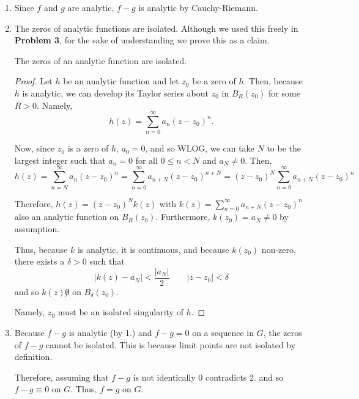 \documentclass[12pt]{Qual}
\begin{document}
\begin{solution}$\,$
\begin{center}
\end{center}
\begin{enumerate}
    \item Since $f$ and $g$ are analytic, $f-g$ is analytic by Cauchy-Riemann.
    \item The zeros of analytic functions are isolated. Although we used this freely in \textbf{Problem 3}, for the sake of understanding we prove this as a claim.
    \begin{claim} The zeros of an analytic function are isolated.
    \begin{proof} Let $h$ be an analytic function and let $z_0$ be a zero of $h.$ Then, because $h$ is analytic, we can develop its Taylor series about $z_0$ in $B_R(z_0)$ for some $R>0$. Namely, $$h(z)=\sum_{n=0}^\infty a_n(z-z_0)^n.$$

    Now, since $z_0$ is a zero of $h$, $a_0=0$, and so WLOG, we can take $N$ to be the largest integer such that $a_n=0$ for all $0\le n<N$ and $a_N\not=0$. Then, $$h(z)=\sum_{n=N}^\infty a_n(z-z_0)^n=\sum_{n=0}^\infty a_{n+N}(z-z_0)^{n+N}=(z-z_0)^N\sum_{n=0}^\infty a_{n+N}(z-z_0)^n$$

    Therefore, $h(z)=(z-z_0)^Nk(z)$ with $k(z)=\sum_{n=0}^\infty a_{n+N}(z-z_0)^n$ also an analytic function on $B_R(z_0)$. Furthermore, $k(z_0)=a_N\not=0$ by assumption.

    Thus, because $k$ is analytic, it is continuous, and because $k(z_0)$ non-zero, there exists a $\delta>0$ such that $$|k(z)-a_N|<\frac{|a_N|}{2}\qquad |z-z_0|<\delta$$ and so $k(z)\not0$ on $B_\delta(z_0)$.

    Namely, $z_0$ must be an isolated singularity of $h$.
    \end{proof}
    \end{claim}
    \item Because $f-g$ is analytic (by 1.) and $f-g=0$ on a sequence in $G$, the zeros of $f-g$ cannot be isolated. This is because limit points are not isolated by definition.

    Therefore, assuming that $f-g$ is not identically $0$ contradicts 2. and so $f-g\equiv 0$ on $G$. Thus, $f=g$ on $G.$
\end{enumerate}
\end{solution}
\end{document}
